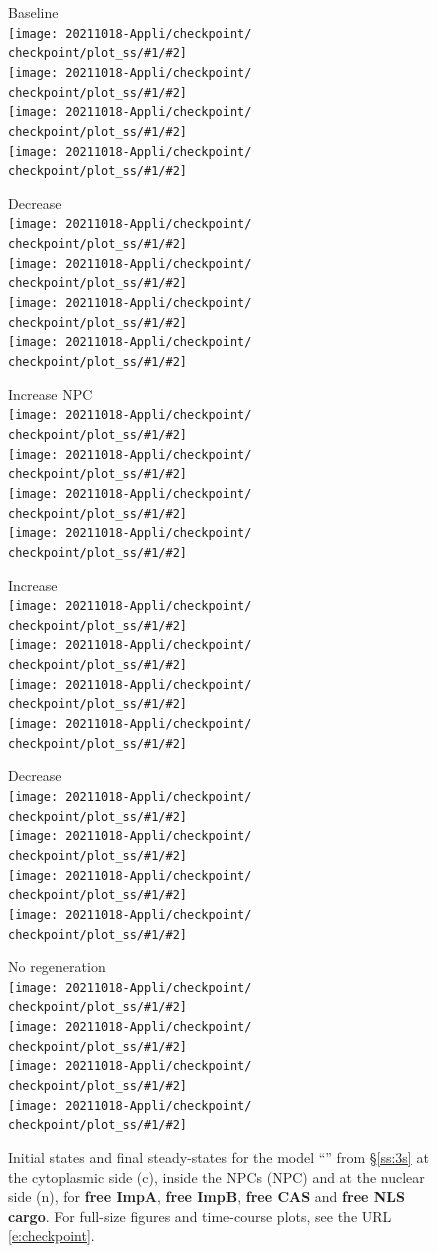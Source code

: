 \documentclass[12pt,notitlepage]{article}
\def\[#1\]{\begin{align}#1\end{align}}
\begin{document}
\begin{figure}[!h]
	\centering
	
	\vspace{-1\baselineskip}
	
	\newcommand{\fig}[2]{%
		\texttt{[image: 20211018-Appli/checkpoint/\\checkpoint/plot\_ss/\#1/\#2]}%
	}
	\newcommand{\figures}[1]{\fig{#1}{Free ImpA}\\\fig{#1}{Free ImpB}\\\fig{#1}{Free CAS}\\\fig{#1}{Free NLS}}
	
	\begin{minipage}{0.32\textwidth}
		\centering
		Baseline \\[0.5\baselineskip]
		\figures{a_Baseline}
	\end{minipage}
	\hfill
	\begin{minipage}{0.32\textwidth}
		\centering
		Decrease  \\[0.5\baselineskip]
		\figures{b_LowImpB}
	\end{minipage}
	\hfill
	\begin{minipage}{0.32\textwidth}
		\centering
		Increase NPC \\[0.5\baselineskip]
		\figures{c_MoreNPC}
	\end{minipage}

	\vspace{\baselineskip}

	\begin{minipage}{0.32\textwidth}
		\centering
		Increase  \\[0.5\baselineskip]
		\figures{d_HighImpA}
	\end{minipage}
	\hfill
	\begin{minipage}{0.32\textwidth}
		\centering
		Decrease  \\[0.5\baselineskip]
		\figures{d_LowImpA}
	\end{minipage}
	\hfill
	\begin{minipage}{0.32\textwidth}
		\centering
		No  regeneration \\[0.5\baselineskip]
		\figures{e_NoEnergy}
	\end{minipage}
	
	\vspace{\baselineskip}
		
	\caption{%
		Initial states and final steady-states for the model 
		``'' from \S\ref{ss:3s}
		at the cytoplasmic side (c),
		inside the NPCs (NPC)
		and 
		at the nuclear side (n),
		for 
		\textbf{free ImpA},
		\textbf{free ImpB},
		\textbf{free CAS}
		and
		\textbf{free NLS cargo}.
		For full-size figures and time-course plots, see the URL \eqref{e:checkpoint}.
	}
	\label{f:app:3s-plot1-ss}
\end{figure}
\end{document}
